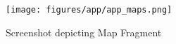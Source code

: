 \begin{figure}[!ht]
\centering
\texttt{[image: figures/app/app\_maps.png]}
\caption{Screenshot depicting Map Fragment}
\label{fig:app_maps}
\end{figure}